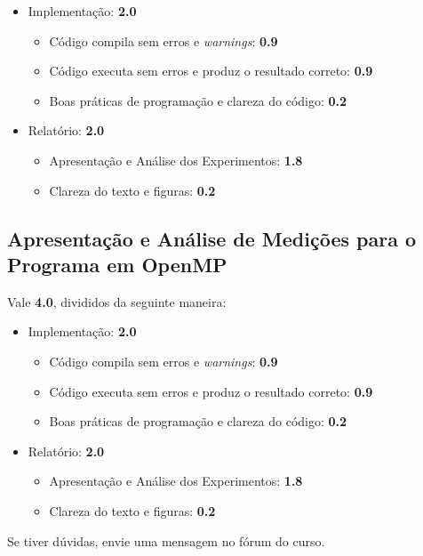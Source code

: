 \documentclass[final,12pt,a4paper]{elsarticle}
\begin{document}
\begin{itemize}
    \item Implementação: \textbf{2.0}
    \begin{itemize}
        \item Código compila sem erros e \textit{warnings}: \textbf{0.9}
        \item Código executa sem erros e produz o resultado correto: \textbf{0.9}
        \item Boas práticas de programação e clareza do código: \textbf{0.2}
    \end{itemize}
    \item Relatório: \textbf{2.0}
    \begin{itemize}
        \item Apresentação e Análise dos Experimentos: \textbf{1.8}
        \item Clareza do texto e figuras: \textbf{0.2}
    \end{itemize}
\end{itemize}

\subsection{Apresentação e Análise de Medições para o Programa em OpenMP}

Vale \textbf{4.0}, divididos da seguinte maneira:

\begin{itemize}
    \item Implementação: \textbf{2.0}
    \begin{itemize}
        \item Código compila sem erros e \textit{warnings}: \textbf{0.9}
        \item Código executa sem erros e produz o resultado correto: \textbf{0.9}
        \item Boas práticas de programação e clareza do código: \textbf{0.2}
    \end{itemize}
    \item Relatório: \textbf{2.0}
    \begin{itemize}
        \item Apresentação e Análise dos Experimentos: \textbf{1.8}
        \item Clareza do texto e figuras: \textbf{0.2}
    \end{itemize}
\end{itemize}

Se tiver dúvidas,  envie uma mensagem no  fórum do curso.
\end{document}
